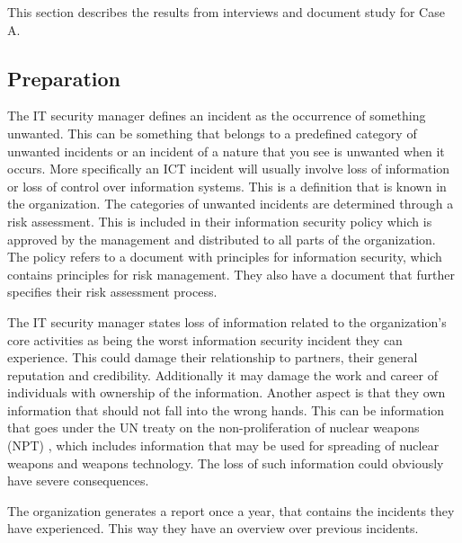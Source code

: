 This section describes the results from interviews and document study for Case A. 

\subsection{Preparation}
The IT security manager defines an incident %
as the occurrence of something unwanted. This can be something that belongs to a predefined category of unwanted incidents or an incident of a nature that you see is unwanted when it occurs. More specifically an \ac{ICT} incident will usually involve loss of information or loss of control over information systems. This is a definition that is known in the organization. The categories of unwanted incidents are determined through a risk assessment. This is included in their information security policy which is approved by the management and distributed to all parts of the organization. The policy refers to a document with principles for information security, which contains principles for risk management. They also have a document that further specifies their risk assessment process. %

The IT security manager states loss of information related to the organization's core activities as being the worst information security incident they can experience. This could damage their relationship to partners, their general reputation and credibility. Additionally it may damage the work and career of individuals with ownership of the information. %
Another aspect is that they own information that should not fall into the wrong hands. This can be information that goes under the \ac{UN} treaty on the non-proliferation of nuclear weapons (NPT) \cite{NPT}, which includes information that may be used for spreading of nuclear weapons and weapons technology. %
The loss of such information could obviously have severe consequences.

The organization generates a report once a year, that contains the incidents they have experienced. This way they have an overview over previous incidents.

